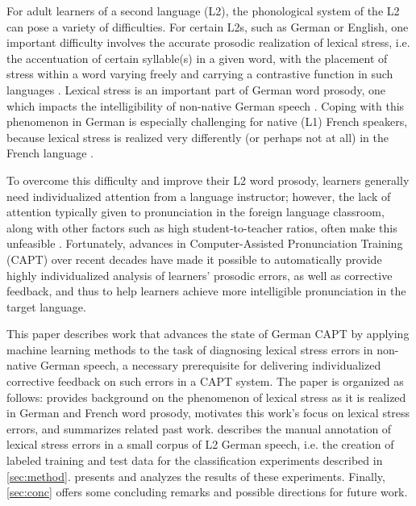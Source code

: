 \documentclass[a4paper]{article}
\begin{document}
  
  For adult learners of a second language (L2), the phonological system of the L2 can pose a variety of difficulties. For certain L2s, such as German or English, one important difficulty involves the accurate prosodic realization of lexical stress, i.e. the accentuation of certain syllable(s) in a given word, with the placement of stress within a word varying freely and carrying a contrastive function in such languages \cite{Cutler2005}. Lexical stress is an important part of German word prosody, 
  {\color{blue} one which 
  impacts} the intelligibility of non-native German speech \cite{Hirschfeld1994}. Coping with this phenomenon in German is especially challenging for native (L1) French speakers, because lexical stress is realized very differently (or perhaps not at all) in the French language \cite{Michaux2013}. %
  
  To overcome this difficulty and improve their L2 word prosody, learners generally need 
  individualized attention from 
  a language instructor; however, the lack of attention typically given to pronunciation in the foreign language classroom, 
  along with other factors such as high student-to-teacher ratios,
  often make this unfeasible
   \cite{Neri2002,Hirschfeld2007}. %
   Fortunately, advances in Computer-Assisted Pronunciation Training (CAPT) over recent decades have made it possible to automatically provide highly individualized analysis of learners' prosodic errors, as well as corrective feedback, 
   and thus to help learners achieve more intelligible pronunciation in the target language. 
  
  This paper describes work that advances the state of German CAPT by applying machine learning methods to the task of diagnosing lexical stress errors in non-native German speech, a necessary prerequisite for delivering individualized corrective feedback on such errors in a CAPT system. The paper is organized as follows:  provides background on the phenomenon of lexical stress as it is realized in German and French word prosody, motivates 
  this work's focus on lexical stress errors, 
   and summarizes related past work. 
    describes the manual annotation of lexical stress errors in a small corpus of L2 German speech, i.e. the creation of labeled training and test data for the classification experiments described in \cref{sec:method}.  presents and analyzes the results of these experiments. Finally, \cref{sec:conc} offers some concluding remarks and possible directions for future work.
\end{document}
